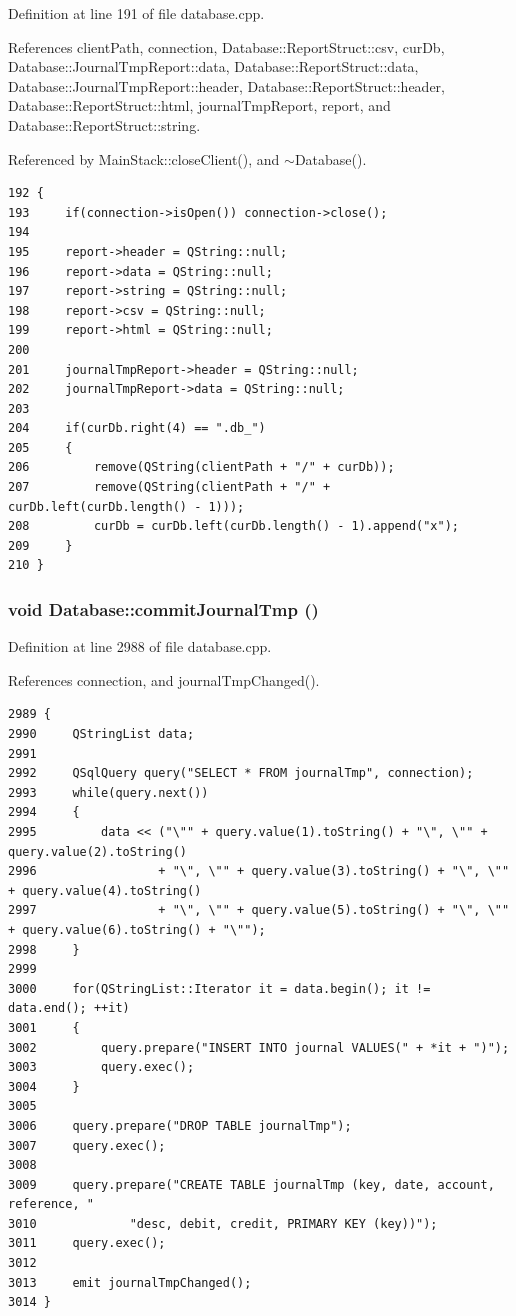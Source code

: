 Definition at line 191 of file database.cpp.

References client\-Path, connection, Database::Report\-Struct::csv, cur\-Db, Database::Journal\-Tmp\-Report::data, Database::Report\-Struct::data, Database::Journal\-Tmp\-Report::header, Database::Report\-Struct::header, Database::Report\-Struct::html, journal\-Tmp\-Report, report, and Database::Report\-Struct::string.

Referenced by Main\-Stack::close\-Client(), and $\sim$Database().

\footnotesize\begin{verbatim}192 {
193     if(connection->isOpen()) connection->close();
194 
195     report->header = QString::null;
196     report->data = QString::null;
197     report->string = QString::null;
198     report->csv = QString::null;
199     report->html = QString::null;
200 
201     journalTmpReport->header = QString::null;
202     journalTmpReport->data = QString::null;
203 
204     if(curDb.right(4) == ".db_")
205     {
206         remove(QString(clientPath + "/" + curDb));
207         remove(QString(clientPath + "/" + curDb.left(curDb.length() - 1)));
208         curDb = curDb.left(curDb.length() - 1).append("x");
209     }
210 }
\end{verbatim}\normalsize 


\hypertarget{classDatabase_a50}{
\subsubsection[commitJournalTmp]{\setlength{\rightskip}{0pt plus 5cm}void Database::commit\-Journal\-Tmp ()}}
\label{classDatabase_a50}


Definition at line 2988 of file database.cpp.

References connection, and journal\-Tmp\-Changed().

\footnotesize\begin{verbatim}2989 {
2990     QStringList data;
2991     
2992     QSqlQuery query("SELECT * FROM journalTmp", connection);
2993     while(query.next())
2994     {
2995         data << ("\"" + query.value(1).toString() + "\", \"" + query.value(2).toString()
2996                 + "\", \"" + query.value(3).toString() + "\", \"" + query.value(4).toString()
2997                 + "\", \"" + query.value(5).toString() + "\", \"" + query.value(6).toString() + "\"");
2998     }
2999     
3000     for(QStringList::Iterator it = data.begin(); it != data.end(); ++it)
3001     {
3002         query.prepare("INSERT INTO journal VALUES(" + *it + ")");
3003         query.exec();
3004     }
3005     
3006     query.prepare("DROP TABLE journalTmp");
3007     query.exec();
3008     
3009     query.prepare("CREATE TABLE journalTmp (key, date, account, reference, "
3010             "desc, debit, credit, PRIMARY KEY (key))");
3011     query.exec();
3012     
3013     emit journalTmpChanged();
3014 }
\end{verbatim}\normalsize 


